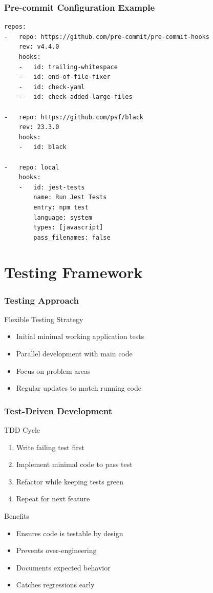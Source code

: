 \documentclass{beamer}
\begin{document}
\begin{frame}[fragile]
    \frametitle{Pre-commit Configuration Example}
    \begin{verbatim}
repos:
-   repo: https://github.com/pre-commit/pre-commit-hooks
    rev: v4.4.0
    hooks:
    -   id: trailing-whitespace
    -   id: end-of-file-fixer
    -   id: check-yaml
    -   id: check-added-large-files

-   repo: https://github.com/psf/black
    rev: 23.3.0
    hooks:
    -   id: black

-   repo: local
    hooks:
    -   id: jest-tests
        name: Run Jest Tests
        entry: npm test
        language: system
        types: [javascript]
        pass_filenames: false
    \end{verbatim}
\end{frame}

\section{Testing Framework}
\begin{frame}
    \frametitle{Testing Approach}
    \begin{block}{Flexible Testing Strategy}
        \begin{itemize}
            \item Initial minimal working application tests
            \item Parallel development with main code
            \item Focus on problem areas
            \item Regular updates to match running code
        \end{itemize}
    \end{block}
\end{frame}

\begin{frame}
    \frametitle{Test-Driven Development}
    \begin{alertblock}{TDD Cycle}
        \begin{enumerate}
            \item Write failing test first
            \item Implement minimal code to pass test
            \item Refactor while keeping tests green
            \item Repeat for next feature
        \end{enumerate}
    \end{alertblock}
    
    \begin{block}{Benefits}
        \begin{itemize}
            \item Ensures code is testable by design
            \item Prevents over-engineering
            \item Documents expected behavior
            \item Catches regressions early
        \end{itemize}
    \end{block}
\end{frame}
\end{document}
